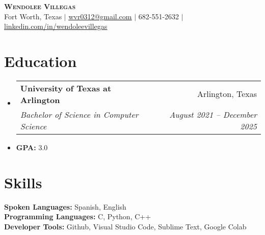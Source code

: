 \documentclass[letterpaper,11pt]{article}
\makeatletter
\newcommand{\resumeItem}[1]{
  \item\small{
    {#1 \vspace{-2pt}}
  }
}
\newcommand{\resumeSubheading}[4]{
  \vspace{-2pt}\item
    \begin{tabular*}{0.97\textwidth}[t]{l@{\extracolsep{\fill}}r}
      \textbf{#1} & #2 \\
      \textit{\small#3} & \textit{\small #4} \\
    \end{tabular*}\vspace{-7pt}
}
\newcommand{\resumeSubHeadingListStart}{\begin{itemize}[leftmargin=0.15in, label={}]}
\newcommand{\resumeSubHeadingListEnd}{\end{itemize}}
\makeatother
\begin{document}


\begin{center}
    \textbf{\Huge \scshape Wendolee Villegas} \\ \vspace{1pt}
    \small Fort Worth, Texas $|$ \href{mailto:x@x.com}{\underline{wvr0312@gmail.com}} $|$ \small 682-551-2632
    $|$ \href{https://linkedin.com/in/wendolee-villegas-565440252/}{\underline{linkedin.com/in/wendoleevillegas}}
\end{center}



\section{Education}
  \resumeSubHeadingListStart
    \resumeSubheading
      {University of Texas at Arlington}{Arlington, Texas}
      {Bachelor of Science in Computer Science}{August 2021 -- December 2025}
      \resumeItem{\textbf{GPA:} 3.0}
  \resumeSubHeadingListEnd

\section{Skills}
 \begin{itemize}[leftmargin=0.15in, label={}]
    \small{\item{
      \textbf{Spoken Languages:}{ Spanish, English} \\
      \textbf{Programming Languages:}{ C, Python, C++} \\
      \textbf{Developer Tools:}{ Github, Visual Studio Code, Sublime Text, Google Colab} \\
     }}
 \end{itemize}
\end{document}

